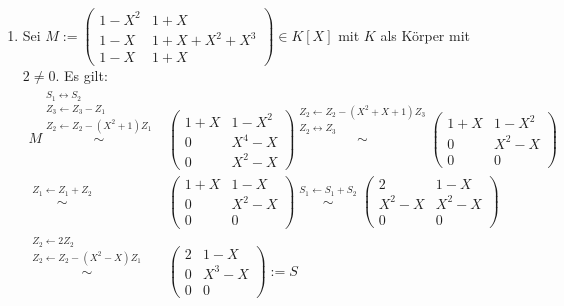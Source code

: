 \documentclass[../../main.tex]{subfiles}
\begin{document}
\begin{bsp}
\begin{enumerate}[\normalfont(a)]
        \item Sei $M:=\begin{pmatrix}1-X^2 & 1+X\\ 1-X & 1+X+X^2+X^3\\ 1-X & 1+X\end{pmatrix}\in K[X]$ mit $K$ als Körper mit $2\neq 0$. Es gilt:
        \begin{align*}
            M\stackrel{\begin{smallmatrix*}S_1\leftrightarrow S_2\\Z_3\leftarrow Z_3-Z_1\\ Z_2\leftarrow Z_2-(X^2+1)Z_1\end{smallmatrix*}}{\sim}&\begin{pmatrix}1+X & 1-X^2\\ 0 & X^4-X\\ 0 & X^2-X\end{pmatrix}\stackrel{\begin{smallmatrix*}Z_2\leftarrow Z_2-(X^2+X+1)Z_3\\ Z_2\leftrightarrow Z_3\end{smallmatrix*}}{\sim}\begin{pmatrix}1+X & 1-X^2\\ 0 & X^2-X\\ 0 & 0\end{pmatrix}\\
            \stackrel{\begin{smallmatrix*}Z_1\leftarrow Z_1+Z_2\end{smallmatrix*}}{\sim}&\begin{pmatrix}1+X & 1-X\\ 0 & X^2-X\\ 0 & 0\end{pmatrix}\stackrel{\begin{smallmatrix*}S_1\leftarrow S_1+S_2\end{smallmatrix*}}{\sim}\begin{pmatrix}2 & 1-X\\ X^2-X & X^2-X\\ 0 & 0\end{pmatrix}\\
            \stackrel{\begin{smallmatrix*}Z_2\leftarrow 2Z_2\\ Z_2\leftarrow Z_2-(X^2-X)Z_1\end{smallmatrix*}}{\sim}&\begin{pmatrix}2 & 1-X\\ 0 & X^3-X\\ 0 & 0\end{pmatrix}:=S
        \end{align*}
    \end{enumerate}
\end{bsp}
\end{document}
